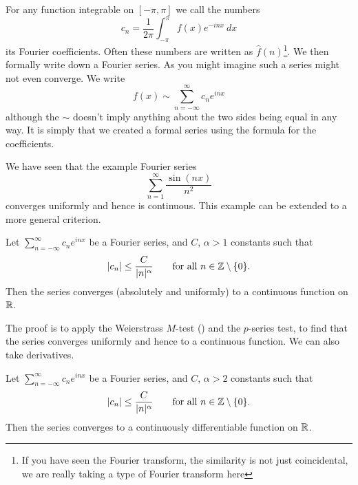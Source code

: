 For any function integrable on $[-\pi,\pi]$ we call the numbers
\begin{equation*}
c_n = 
\frac{1}{2\pi} \int_{-\pi}^\pi
f(x) e^{-inx} ~ dx
\end{equation*}
its Fourier coefficients.  Often these numbers are
written as $\hat{f}(n)$\footnote{If you have seen the Fourier transform,
the similarity is not just
coincidental, we are really taking a type of Fourier transform here}.
We then formally write down a Fourier series.
As you might imagine such a series might not even converge.
We write
\begin{equation*}
f(x) \sim
\sum_{n=-\infty}^\infty c_n e^{inx}
\end{equation*}
although the $\sim$ doesn't imply anything about the two sides being equal
in any way.  It is simply that we created a formal series using the formula
for the coefficients.

We have seen that the example Fourier series 
\begin{equation*}
\sum_{n=1}^\infty \frac{\sin(nx)}{n^2}
\end{equation*}
converges uniformly and hence is continuous.  This 
example can be extended to a more general criterion.

\begin{prop}
Let $\sum_{n=-\infty}^\infty c_n e^{inx}$ be a Fourier series,
and $C$, $\alpha > 1$ constants such that
\begin{equation*}
\lvert {c_n} \rvert \leq \frac{C}{\lvert {n} \rvert^\alpha}
\qquad \text{for all $n \in {\mathbb{Z}} \setminus \{ 0 \}$}.
\end{equation*}
Then the series converges (absolutely and uniformly) to a continuous function on ${\mathbb{R}}$.
\end{prop}

The proof is to apply the Weierstrass $M$-test () and
the $p$-series test, to find that the series converges uniformly and hence
to a continuous function.
We can also take derivatives.

\begin{prop}
Let $\sum_{n=-\infty}^\infty c_n e^{inx}$ be a Fourier series,
and $C$, $\alpha > 2$ constants such that
\begin{equation*}
\lvert {c_n} \rvert \leq \frac{C}{\lvert {n} \rvert^\alpha}
\qquad \text{for all $n \in {\mathbb{Z}} \setminus \{ 0 \}$}.
\end{equation*}
Then the series converges to a continuously differentiable function on ${\mathbb{R}}$.
\end{prop}


